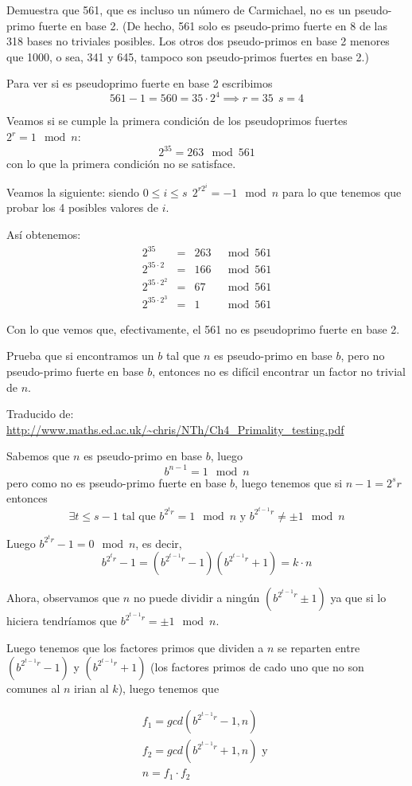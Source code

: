 \begin{problem}[17]
Demuestra que 561, que es incluso un número de Carmichael, no es un
pseudo-primo fuerte en base 2. (De hecho, 561 solo es pseudo-primo
fuerte en 8 de las 318 bases no triviales posibles. Los otros dos
pseudo-primos en base 2 menores que 1000, o sea, 341 y 645,
tampoco son pseudo-primos fuertes en base 2.)
\solution


Para ver si es pseudoprimo fuerte en base 2 escribimos
\[561 - 1 = 560 = 35 \cdot 2^4 \implies r=35 \ \ s=4\]

Veamos si se cumple la primera condición de los pseudoprimos fuertes $2^r = 1 \mod n$:
\[ 2^{35}=263 \mod 561 \]
con lo que la primera condición no se satisface.

Veamos la siguiente: siendo $0 \leq i \leq s \ \ 2^{r2^i}=-1 \mod n$ para lo que tenemos que probar los 4 posibles valores de $i$.

Así obtenemos:
\[\begin{array}{rcrl}
2^{35} & = & 263 & \mod 561 \\
2^{35\cdot 2} & = & 166  & \mod 561\\
2^{35 \cdot 2^2} & = & 67 & \mod 561\\
2^{35\cdot 2^3} & = & 1 & \mod 561
\end{array}\]

Con lo que vemos que, efectivamente, el 561 no es pseudoprimo fuerte en base 2.

\end{problem}

\begin{problem}[18]
Prueba que si encontramos un $b$ tal que $n$ es pseudo-primo en base
$b$, pero no pseudo-primo fuerte en base $b$, entonces no es
difícil encontrar un factor no trivial de $n$.
\solution
{}

Traducido de: \url{http://www.maths.ed.ac.uk/~chris/NTh/Ch4_Primality_testing.pdf}

Sabemos que $n$ es pseudo-primo en base $b$, luego 
\[b^{n-1} = 1 \mod n\]
pero como no es pseudo-primo fuerte en base $b$, luego tenemos que si $n-1=2^{s}r$ entonces 
\[\exists t\leq s-1 \text{ tal que } b^{2^{t}r} = 1 \mod n \text{ y } b^{2^{t-1}r} \neq \pm 1 \mod n\]

Luego $b^{2^{t}r} - 1 = 0 \mod n$, es decir, 
\[b^{2^{t}r} - 1 = (b^{2^{t-1}r} - 1) (b^{2^{t-1}r} + 1) = k \cdot n\]

Ahora, observamos que $n$ no puede dividir a ningún $(b^{2^{t-1}r} \pm 1)$ ya que si lo hiciera tendríamos que $b^{2^{t-1}r} = \pm 1 \mod n$.

Luego tenemos que los factores primos que dividen a $n$ se reparten entre $(b^{2^{t-1}r} - 1)$ y $(b^{2^{t-1}r} + 1)$ (los factores primos de cado uno que no son comunes al $n$ irian al $k$), luego tenemos que

\begin{gather*}
f_1 = gcd(b^{2^{t-1}r} - 1,n)\\
f_2 = gcd(b^{2^{t-1}r} + 1,n) \text{ y }\\
n = f_1 \cdot f_2
\end{gather*}


\end{problem}

